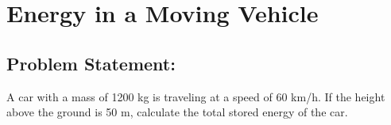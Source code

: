 \documentclass[letterpaper,10pt,english]{jupyterBook}
\begin{document}
\section{Energy in a Moving Vehicle}
\label{\detokenize{notebooks/Chapter2/Problem_3_Energy_in_a_Moving_Vehicle:energy-in-a-moving-vehicle}}\label{\detokenize{notebooks/Chapter2/Problem_3_Energy_in_a_Moving_Vehicle::doc}}

\subsection{Problem Statement:}
\label{\detokenize{notebooks/Chapter2/Problem_3_Energy_in_a_Moving_Vehicle:problem-statement}}
\sphinxAtStartPar
A car with a mass of 1200 kg is traveling at a speed of 60 km/h.
If the height above the ground is 50 m, calculate the total stored energy of the car.
\end{document}
